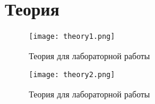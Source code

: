 \chapter{Теория}
\label{ch:intro}

\begin{figure}[H]
    \centering
    \texttt{[image: theory1.png]}
    \caption{Теория для лабораторной работы}
\end{figure}

\begin{figure}[H]
    \centering
    \texttt{[image: theory2.png]}
    \caption{Теория для лабораторной работы}
\end{figure}


\endinput